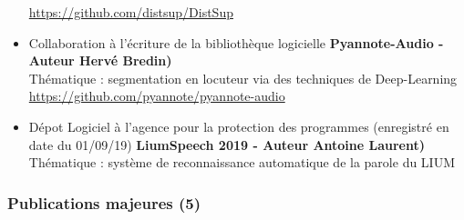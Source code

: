 \documentclass[11pt,a4paper]{article}
\begin{document}
\begin{itemize}
\href{https://github.com/distsup/DistSup}{https://github.com/distsup/DistSup}
\item Collaboration à l'écriture de la bibliothèque logicielle
{\bf Pyannote-Audio - Auteur Hervé Bredin)} \\
Thématique : segmentation en locuteur via des techniques de Deep-Learning \\
\href{https://github.com/pyannote/pyannote-audio}{https://github.com/pyannote/pyannote-audio}
\item Dépot Logiciel à  l’agence pour la protection des programmes (enregistré en date du 01/09/19)
{\bf LiumSpeech 2019 - Auteur Antoine Laurent)} \\
Thématique : système de reconnaissance automatique de la parole du LIUM \\

\end{itemize}



\subsubsection{Publications majeures (5)}\label{sec:pub_majeurs}
\end{document}
